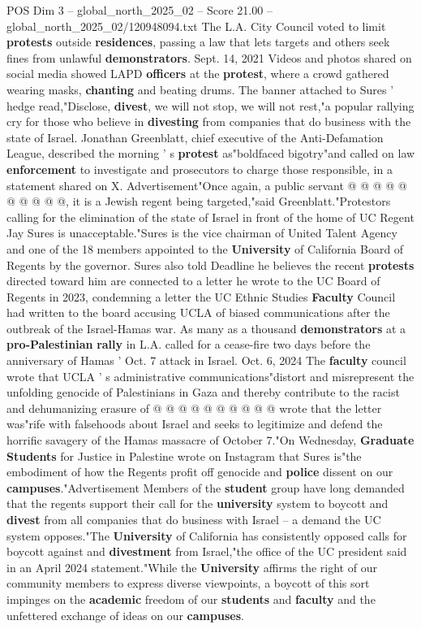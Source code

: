 \begin{textsample}{POS Dim 3 – global\_north\_2025\_02 – Score 21.00 – global\_north\_2025\_02/120948094.txt}
The L.A.
City Council voted to limit \textbf{protests} outside \textbf{residences}, passing a law that lets targets and others seek fines from unlawful \textbf{demonstrators}.
Sept. 14, 2021 Videos and photos shared on social media showed LAPD \textbf{officers} at the \textbf{protest}, where a crowd gathered wearing masks, \textbf{chanting} and beating drums.
The banner attached to Sures ' hedge read,"Disclose, \textbf{divest}, we will not stop, we will not rest,"a popular rallying cry for those who believe in \textbf{divesting} from companies that do business with the state of Israel.
Jonathan Greenblatt, chief executive of the Anti-Defamation League, described the morning ' s \textbf{protest} as"boldfaced bigotry"and called on law \textbf{enforcement} to investigate and prosecutors to charge those responsible, in a statement shared on X.
Advertisement"Once again, a public servant @ @ @ @ @ @ @ @ @ @, it is a Jewish regent being targeted,"said Greenblatt."Protestors calling for the elimination of the state of Israel in front of the home of UC Regent Jay Sures is unacceptable."Sures is the vice chairman of United Talent Agency and one of the 18 members appointed to the \textbf{University} of California Board of Regents by the governor.
Sures also told Deadline he believes the recent \textbf{protests} directed toward him are connected to a letter he wrote to the UC Board of Regents in 2023, condemning a letter the UC Ethnic Studies \textbf{Faculty} Council had written to the board accusing UCLA of biased communications after the outbreak of the Israel-Hamas war.
As many as a thousand \textbf{demonstrators} at a \textbf{pro-Palestinian} \textbf{rally} in L.A. called for a cease-fire two days before the anniversary of Hamas ' Oct. 7 attack in Israel.
Oct. 6, 2024 The \textbf{faculty} council wrote that UCLA ' s administrative communications"distort and misrepresent the unfolding genocide of Palestinians in Gaza and thereby contribute to the racist and dehumanizing erasure of @ @ @ @ @ @ @ @ @ @ wrote that the letter was"rife with falsehoods about Israel and seeks to legitimize and defend the horrific savagery of the Hamas massacre of October 7."On Wednesday, \textbf{Graduate} \textbf{Students} for Justice in Palestine wrote on Instagram that Sures is"the embodiment of how the Regents profit off genocide and \textbf{police} dissent on our \textbf{campuses}."Advertisement Members of the \textbf{student} group have long demanded that the regents support their call for the \textbf{university} system to boycott and \textbf{divest} from all companies that do business with Israel -- a demand the UC system opposes."The \textbf{University} of California has consistently opposed calls for boycott against and \textbf{divestment} from Israel,"the office of the UC president said in an April 2024 statement."While the \textbf{University} affirms the right of our community members to express diverse viewpoints, a boycott of this sort impinges on the \textbf{academic} freedom of our \textbf{students} and \textbf{faculty} and the unfettered exchange of ideas on our \textbf{campuses}.

\end{textsample}
